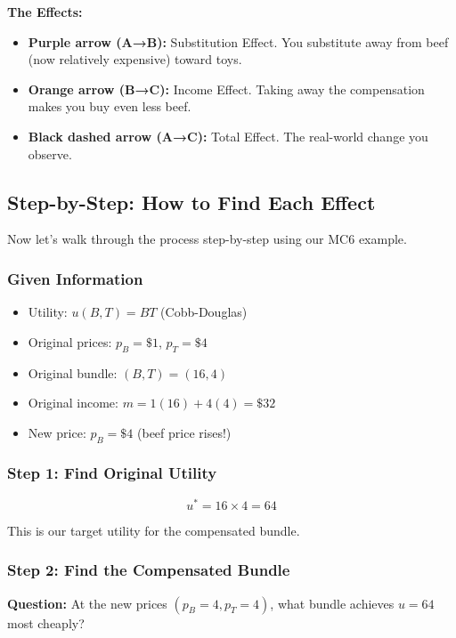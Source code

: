 \documentclass[11pt]{article}
\begin{document}
\textbf{The Effects:}
\begin{itemize}
    \item \textbf{Purple arrow (A→B):} Substitution Effect. You substitute away from beef (now relatively expensive) toward toys.
    \item \textbf{Orange arrow (B→C):} Income Effect. Taking away the compensation makes you buy even less beef.
    \item \textbf{Black dashed arrow (A→C):} Total Effect. The real-world change you observe.
\end{itemize}

\newpage

\subsection{Step-by-Step: How to Find Each Effect}

Now let's walk through the process step-by-step using our MC6 example.

\subsubsection{Given Information}

\begin{itemize}
    \item Utility: $u(B, T) = BT$ (Cobb-Douglas)
    \item Original prices: $p_B = \$1$, $p_T = \$4$
    \item Original bundle: $(B, T) = (16, 4)$
    \item Original income: $m = 1(16) + 4(4) = \$32$
    \item New price: $p_B = \$4$ (beef price rises!)
\end{itemize}

\subsubsection{Step 1: Find Original Utility}

$$u^* = 16 \times 4 = 64$$

This is our target utility for the compensated bundle.

\subsubsection{Step 2: Find the Compensated Bundle}

\textbf{Question:} At the new prices $(p_B=4, p_T=4)$, what bundle achieves $u=64$ most cheaply?
\end{document}
